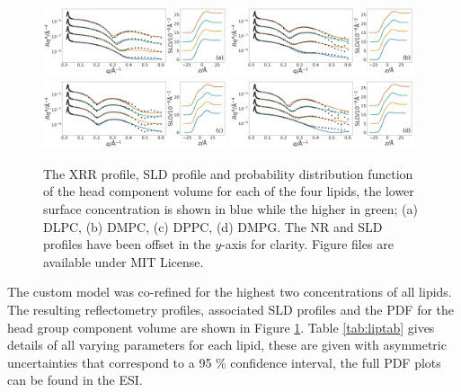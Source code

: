 \documentclass[twoside,twocolumn,9pt]{article}
\begin{document}
\begin{figure}
	\centering
	\includegraphics[width=0.48\textwidth]{figures/DLPC_all_data}
	\includegraphics[width=0.48\textwidth]{figures/DMPC_all_data}
	\includegraphics[width=0.48\textwidth]{figures/DPPC_all_data}
	\includegraphics[width=0.48\textwidth]{figures/DMPG_all_data}
	\caption{The XRR profile, SLD profile and probability distribution function of the head component volume for each of the four lipids, the lower surface concentration is shown in blue while the higher in green; (a) DLPC, (b) DMPC, (c) DPPC, (d) DMPG. The NR and SLD profiles have been offset in the $y$-axis for clarity. Figure files are available under MIT License.\cite{mccluskey_2018}}
	\label{fig:lipids}
\end{figure}
The custom model was co-refined for the highest two concentrations of all lipids. The resulting reflectometry profiles, associated SLD profiles and the PDF for the head group component volume are shown in Figure \ref{fig:lipids}. Table \ref{tab:liptab} gives details of all varying parameters for each lipid, these are given with asymmetric uncertainties that correspond to a 95 \% confidence interval, the full PDF plots can be found in the ESI. 
\end{document}
